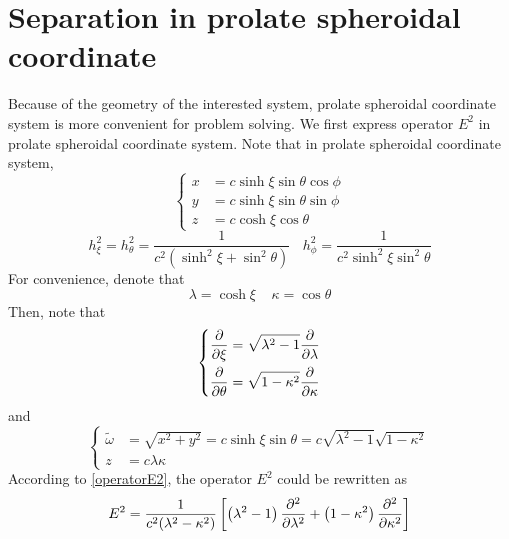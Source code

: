 \documentclass[fontsize=11pt, %
                             paper=a4, %
                             twoside, %
                             captions=tableheading,
                             index=totoc,
                             hyperref]{labbook}
\begin{document}
\section{Separation in prolate spheroidal coordinate}
Because of the geometry of the interested system, prolate spheroidal coordinate system is more convenient for problem solving. We first express operator $E^2$ in prolate spheroidal coordinate system. Note that in prolate spheroidal coordinate system,
\begin{equation}
\left\{
\begin{aligned}
x&=c\sinh\xi\sin\theta\cos\phi\\
y&=c\sinh\xi\sin\theta\sin\phi\\
z&=c\cosh\xi\cos\theta
\end{aligned}
\right.
\end{equation}
\begin{equation}
h_\xi^2=h_\theta^2=\frac{1}{c^2\left(\sinh^2\xi+\sin^2\theta\right)} \ \ \ \ h_\phi^2=\frac{1}{c^2\sinh^2\xi\sin^2\theta}
\end{equation}
For convenience, denote that
\begin{equation}
\lambda =\cosh \xi \ \ \ \ \ \kappa=\cos\theta
\end{equation}
Then, note that
\begin{equation}\label{eqn_differential}
\left\{
\begin{aligned}
\frac{\partial }{\partial \xi}&=\sqrt{\lambda^2-1}\frac{\partial }{\partial \lambda}\\
\frac{\partial }{\partial \theta}&=\sqrt{1-\kappa^2}\frac{\partial }{\partial \kappa}\\
\end{aligned}
\right.
\end{equation}
and
\begin{equation}
\left\{
\begin{aligned}
\tilde{\omega}&=\sqrt{x^2+y^2}=c\sinh\xi\sin\theta=c\sqrt{\lambda^2-1}\sqrt{1-\kappa^2}\\
z&=c\lambda\kappa
\end{aligned}
\right.
\end{equation}
According to \ref{operatorE2}, the operator $E^2$ could be rewritten as
\begin{equation}
E^2=\frac{1}{c^2(\lambda^2-\kappa^2)}\left[\left(\lambda^2-1\right)\frac{\partial^2 }{\partial \lambda^2}+\left(1-\kappa^2\right)\frac{\partial^2 }{\partial \kappa^2}\right]
\end{equation}
\end{document}
